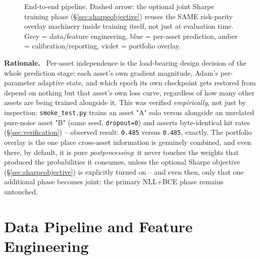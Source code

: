 \documentclass[11pt]{article}
\newcommand{\rationalelabel}{\small\textbf{Rationale.}~}
\begin{document}
\begin{figure}[H]
{%
}
\caption{End-to-end pipeline. Dashed arrow: the optional joint Sharpe training phase
(\S\ref{sec:sharpeobjective}) reuses the SAME risk-parity overlay machinery inside training
itself, not just at evaluation time. Grey = data/feature engineering, blue = per-asset
prediction, amber = calibration/reporting, violet = portfolio overlay.}
\label{fig:pipeline}
\end{figure}

\begin{rationale}\rationalelabel
Per-asset independence is the load-bearing design decision of the whole prediction stage:
each asset's own gradient magnitude, Adam's per-parameter adaptive state, and which epoch its
own checkpoint gets restored from depend on nothing but that asset's own loss curve,
regardless of how many other assets are being trained alongside it. This was verified
\emph{empirically}, not just by inspection: \texttt{smoke\_test.py} trains an asset "A" solo
versus alongside an unrelated pure-noise asset "B" (same seed, \texttt{dropout=0}) and asserts
byte-identical hit rates (\S\ref{sec:verification}) -- observed result: \texttt{0.485} versus
\texttt{0.485}, exactly. The portfolio overlay is the one place cross-asset information is
genuinely combined, and even there, by default, it is pure \emph{postprocessing}: it never
touches the weights that produced the probabilities it consumes, unless the optional Sharpe
objective (\S\ref{sec:sharpeobjective}) is explicitly turned on -- and even then, only that
one additional phase becomes joint; the primary NLL+BCE phase remains untouched.
\end{rationale}

\section{Data Pipeline and Feature Engineering}
\label{sec:data}
\end{document}
